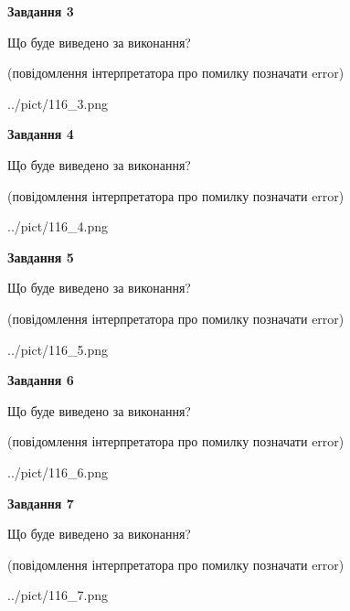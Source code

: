\documentclass[12pt, ukrainian]{article}
\begin{document}
{\begin {large}
{\begin {center}\textbf{Завдання 3}\end {center}}\par
Що буде виведено за виконання?\par
 (повідомлення інтерпретатора про помилку позначати error)\par
\begin{center}
	{../pict/116_3.png}
\end{center}
\newpage

{\begin {center}\textbf{Завдання 4}\end {center}}\par
Що буде виведено за виконання?\par
 (повідомлення інтерпретатора про помилку позначати error)\par
\begin{center}
	{../pict/116_4.png}
\end{center}
\newpage

{\begin {center}\textbf{Завдання 5}\end {center}}\par
Що буде виведено за виконання?\par
 (повідомлення інтерпретатора про помилку позначати error)\par
\begin{center}
	{../pict/116_5.png}
\end{center}
\newpage

{\begin {center}\textbf{Завдання 6}\end {center}}\par
Що буде виведено за виконання?\par
 (повідомлення інтерпретатора про помилку позначати error)\par
\begin{center}
	{../pict/116_6.png}
\end{center}
\newpage

{\begin {center}\textbf{Завдання 7}\end {center}}\par
Що буде виведено за виконання?\par
 (повідомлення інтерпретатора про помилку позначати error)\par
\begin{center}
	{../pict/116_7.png}
\end{center}
\newpage


\end{large}}
\end{document}
